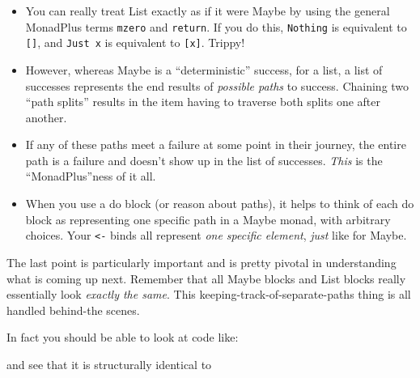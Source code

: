 \documentclass[]{article}
\newenvironment{Shaded}{}{}
\newcommand{\KeywordTok}[1]{\textcolor[rgb]{0.00,0.44,0.13}{\textbf{{#1}}}}
\newcommand{\DecValTok}[1]{\textcolor[rgb]{0.25,0.63,0.44}{{#1}}}
\newcommand{\OtherTok}[1]{\textcolor[rgb]{0.00,0.44,0.13}{{#1}}}
\newcommand{\FunctionTok}[1]{\textcolor[rgb]{0.02,0.16,0.49}{{#1}}}
\newcommand{\NormalTok}[1]{{#1}}
\begin{document}
\begin{itemize}
\tightlist
\item
  You can really treat List exactly as if it were Maybe by using the
  general MonadPlus terms \texttt{mzero} and \texttt{return}. If you do
  this, \texttt{Nothing} is equivalent to \texttt{{[}{]}}, and
  \texttt{Just\ x} is equivalent to \texttt{{[}x{]}}. Trippy!
\item
  However, whereas Maybe is a ``deterministic'' success, for a list, a
  list of successes represents the end results of \emph{possible paths}
  to success. Chaining two ``path splits'' results in the item having to
  traverse both splits one after another.
\item
  If any of these paths meet a failure at some point in their journey,
  the entire path is a failure and doesn't show up in the list of
  successes. \emph{This} is the ``MonadPlus''ness of it all.
\item
  When you use a do block (or reason about paths), it helps to think of
  each do block as representing one specific path in a Maybe monad, with
  arbitrary choices. Your \texttt{\textless{}-} binds all represent
  \emph{one specific element}, \emph{just} like for Maybe.
\end{itemize}

The last point is particularly important and is pretty pivotal in
understanding what is coming up next. Remember that all Maybe blocks and
List blocks really essentially look \emph{exactly the same}. This
keeping-track-of-separate-paths thing is all handled behind-the scenes.

In fact you should be able to look at code like:

\begin{Shaded}
\end{Shaded}

and see that it is structurally identical to
\end{document}
